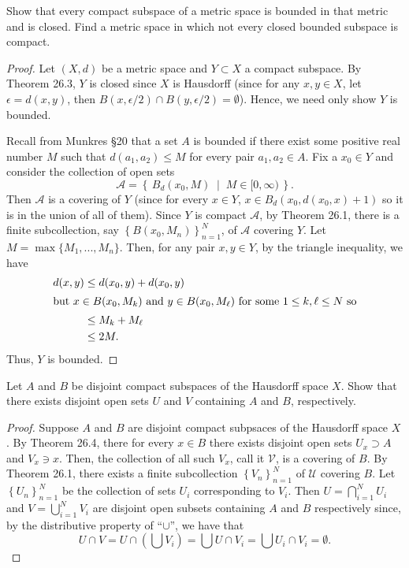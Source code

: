 \newpage
\begin{problem}[Munkres \S26, Ex.\,4]
Show that every compact subspace of a metric space is bounded in
that metric and is closed. Find a metric space in which not every
closed bounded subspace is compact.
\end{problem}
\begin{proof}
Let $(X,d)$ be a metric space and $Y\subset X$ a compact
subspace. By Theorem 26.3, $Y$ is closed since $X$ is Hausdorff
(since for any $x,y\in X$, let $\epsilon=d(x,y)$, then
$B(x,\epsilon/2)\cap B(y,\epsilon/2)=\emptyset$). Hence, we need
only show $Y$ is bounded.

Recall from Munkres \S20 that a set $A$ is bounded if there exist
some positive real number $M$ such that $d(a_1,a_2)\leq M$ for
every pair $a_1,a_2\in A$. Fix a $x_0\in Y$ and consider the
collection of open sets
\[
\mathcal{A}=\left\{\,B_d(x_0,M)\;\middle|\;M\in[0,\infty)\,\right\}.
\]
Then $\mathcal{A}$ is a covering of $Y$ (since for every $x\in
Y$, $x\in B_d(x_0,d(x_0,x)+1)$ so it is in the union of all of
them). Since $Y$ is compact $\mathcal{A}$, by Theorem 26.1, there
is a finite subcollection, say
$\left\{B(x_0,M_n)\right\}_{n=1}^N$, of $\mathcal{A}$ covering
$Y$. Let $M=\max\{M_1,...,M_n\}$. Then, for any pair $x,y\in Y$,
by the triangle inequality, we have
\begin{align*}
d(x,y)&\leq d(x_0,y)+d(x_0,y)\\
\intertext{but $x\in B(x_0,M_k)$ and $y\in B(x_0,M_\ell)$
  for some $1\leq k,\ell\leq N$ so}
      &\leq M_k+M_\ell\\
      &\leq 2M.
\end{align*}
Thus, $Y$ is bounded.
\end{proof}
\newpage
\begin{problem}[Munkres \S26, Ex.\,5]
Let $A$ and $B$ be disjoint compact subspaces of the Hausdorff
space $X$. Show that there exists disjoint open sets $U$ and $V$
containing $A$ and $B$, respectively.
\end{problem}
\begin{proof}
Suppose $A$ and $B$ are disjoint compact subpsaces of the
Hausdorff space $X$. By Theorem 26.4, there for every $x\in B$
there exists disjoint open sets $U_x\supset A$ and $V_x\ni x$. Then,
the collection of all such $V_x$, call it $\mathcal{V}$, is a
covering of $B$. By Theorem 26.1, there exists a finite
subcollection $\left\{V_n\right\}_{n=1}^N$ of $\mathcal{U}$
covering $B$. Let $\left\{U_n\right\}_{n=1}^N$ be the collection
of sets $U_i$ corresponding to $V_i$. Then $U=\bigcap_{i=1}^N
U_i$ and $V=\bigcup_{i=1}^N V_i$ are disjoint open subsets
containing $A$ and $B$ respectively since, by the distributive
property of ``$\cup$'', we have that
\[
U\cap V=U\cap\left(\bigcup V_i\right)=\bigcup U\cap V_i=\bigcup
U_i\cap V_i=\emptyset.
\]
\end{proof}

